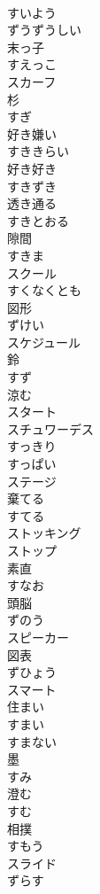 \documentclass[8pt]{extreport}
\begin{document}
\begin{CJK}{UTF8}{min}
\\	すいよう	
\\	ずうずうしい	
\\	末っ子 
\\	すえっこ	
\\	スカーフ	
\\	杉 
\\	すぎ	
\\	好き嫌い 
\\	すききらい	
\\	好き好き 
\\	すきずき	
\\	透き通る 
\\	すきとおる	
\\	隙間 
\\	すきま	
\\	スクール	
\\	すくなくとも	
\\	図形 
\\	ずけい	
\\	スケジュール	
\\	鈴 
\\	すず	
\\	涼む 
\\	スタート	
\\	スチュワーデス	
\\	すっきり	
\\	すっぱい	
\\	ステージ	
\\	棄てる 
\\	すてる	
\\	ストッキング	
\\	ストップ	
\\	素直 
\\	すなお	
\\	頭脳 
\\	ずのう	
\\	スピーカー	
\\	図表 
\\	ずひょう	
\\	スマート	
\\	住まい 
\\	すまい	
\\	すまない	
\\	墨 
\\	すみ	
\\	澄む 
\\	すむ	
\\	相撲 
\\	すもう	
\\	スライド	
\\	ずらす	

\end{CJK}
\end{document}
